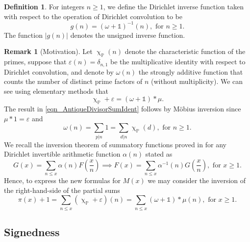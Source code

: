 \documentclass[11pt,reqno,a4letter]{article}
\numberwithin{equation}{section}
\numberwithin{figure}{section}
\numberwithin{table}{section}
\renewcommand{\chi}{\upchi}
\theoremstyle{plain}
\numberwithin{theorem}{section}
\theoremstyle{definition}
\newtheorem{remark}[theorem]{Remark}
\newtheorem{definition}[theorem]{Definition}
\begin{document}
\begin{definition}
\label{def_gn_and_Absgn_v2} 
For integers $n \geq 1$, we define the Dirichlet inverse function 
taken with respect to the operation of Dirichlet convolution to be 
\[
g(n) = (\omega + \mathds{1})^{-1}(n), \text{ for } n \geq 1. 
\]
The function $|g(n)|$ denotes the unsigned inverse function. 
\end{definition}

\begin{remark}[Motivation] 
Let $\chi_{\mathbb{P}}(n)$ denote the characteristic function of the primes, suppose that 
$\varepsilon(n) = \delta_{n,1}$ be the multiplicative identity 
with respect to Dirichlet convolution, 
and denote by $\omega(n)$ the strongly additive function that counts the number of 
distinct prime factors of $n$ (without multiplicity). 
We can see using elementary methods that 
\begin{equation}
\label{eqn_AntiqueDivisorSumIdent} 
\chi_{\mathbb{P}} + \varepsilon = (\omega + \mathds{1}) \ast \mu. 
\end{equation} 
The result in \eqref{eqn_AntiqueDivisorSumIdent} follows by M\"obius inversion 
since $\mu \ast 1 = \varepsilon$ and 
\[
\omega(n) = \sum_{p|n} 1 = \sum_{d|n} \chi_{\mathbb{P}}(d), \text{ for } n \geq 1. 
\]
We recall the inversion theorem of summatory functions proved in 
\cite[\S 2.14]{APOSTOLANUMT} for any Dirichlet invertible arithmetic 
function $\alpha(n)$ stated as 
\begin{equation}
\label{eqn_ApostolStmt_ClassicSummatoryFuncInvThm_v1} 
G(x) = \sum_{n \leq x} \alpha(n) F\left(\frac{x}{n}\right) \implies 
     F(x) = \sum_{n \leq x} \alpha^{-1}(n) G\left(\frac{x}{n}\right), 
     \text{ for } x \geq 1. 
\end{equation}
Hence, to express the new formulas for $M(x)$ 
we may consider the inversion of the right-hand-side of the partial sums 
\[
\pi(x) + 1 = \sum_{n \leq x} \left(\chi_{\mathbb{P}} + \varepsilon\right)(n) = 
	\sum_{n \leq x} (\omega + \mathds{1}) \ast \mu(n), 
	\text{ for } x \geq 1. 
\]
\end{remark}

\subsection{Signedness}
\label{Section_PrelimProofs_Config} 
\label{subSection_ProofOfSignednessOfgInvn_v1} 
\end{document}
